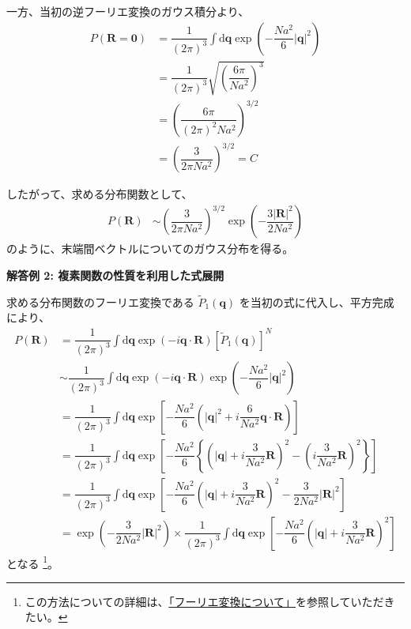 \documentclass[uplatex,dvipdfmx,a4paper,11pt]{jsarticle}
\newcommand{\diff}{\mathrm d}
\begin{document}
\begin{enumerate}
一方、当初の逆フーリエ変換のガウス積分より、
\begin{align*}
P(\bm{R}=\bm{0}) 
	&= \dfrac{1}{(2 \pi)^3} \int \diff \bm{q} \exp \left( - \dfrac{Na^2}{6} |\bm{q}|^2 \right) \\
	&= \dfrac{1}{(2 \pi)^3} \sqrt{\left( \dfrac{6 \pi}{N a^2} \right)^{3} }\\
	&= \left( \dfrac{6 \pi}{(2 \pi)^2 N a^2} \right)^{3/2} \\
	&= \left( \dfrac{3}{2 \pi N a^2} \right)^{3/2} = C
\end{align*}

したがって、求める分布関数として、
\begin{align*}
P(\bm{R}) 
	&\sim \left( \dfrac{3}{2 \pi N a^2} \right)^{3/2} \exp \left( -\dfrac{3|\bm{R}|^2}{2Na^2} \right)
\end{align*}
のように、末端間ベクトルについてのガウス分布を得る。

\newpage

\vspace{10pt}

{\bf 解答例 2: 複素関数の性質を利用した式展開}

求める分布関数のフーリエ変換である $\tilde{P}_1 (\bm{q}) $ を当初の式に代入し、平方完成により、
\begin{align*}
P(\bm{R}) 
	&= \dfrac{1}{(2 \pi)^3} \int \diff \bm{q} \exp \left( -i \bm{q} \cdot \bm{R} \right) \left[\tilde{P}_1 (\bm{q}) \right]^N \\
	&\sim \dfrac{1}{(2 \pi)^3} \int \diff \bm{q} \exp \left( -i \bm{q} \cdot \bm{R} \right) \exp \left( - \dfrac{Na^2}{6} |\bm{q}|^2 \right) \\
	&= \dfrac{1}{(2 \pi)^3} \int \diff \bm{q} \exp \left[ - \dfrac{Na^2}{6} \left( |\bm{q}|^2 + i \dfrac{6}{Na^2}\bm{q} \cdot \bm{R} \right) \right] \\
	&= \dfrac{1}{(2 \pi)^3} \int \diff \bm{q} \exp \left[ - \dfrac{Na^2}{6} \left\{ \left( |\bm{q}| + i \dfrac{3}{Na^2} \bm{R} \right)^2 - \left( i \dfrac{3}{Na^2} \bm{R} \right)^2 \right\} \right] \\
	&= \dfrac{1}{(2 \pi)^3} \int \diff \bm{q} \exp \left[ - \dfrac{Na^2}{6} \left( |\bm{q}| + i \dfrac{3}{Na^2} \bm{R} \right)^2 - \dfrac{3}{2Na^2} |\bm{R}|^2  \right] \\
	&= \exp \left(- \dfrac{3}{2Na^2} |\bm{R}|^2  \right) \times \dfrac{1}{(2 \pi)^3} \int \diff \bm{q} \exp \left[ - \dfrac{Na^2}{6} \left( |\bm{q}| + i \dfrac{3}{Na^2} \bm{R} \right)^2 \right]
\end{align*}
となる
\footnote{
この方法についての詳細は、\href{https://dl.dropboxusercontent.com/u/18899343/Math/Fourier_Transform.pdf}{「フーリエ変換について」}を参照していただきたい。
}。


\end{enumerate}
\end{document}
